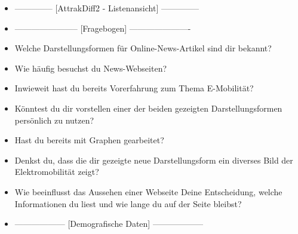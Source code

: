 {\begin{itemize}[]
        \item {--------------} [AttrakDiff2 - Listenansicht] {--------------}
        \item {-----------------------} [Fragebogen] {----------------------}
        \item {} Welche Darstellungsformen für Online-News-Artikel sind dir bekannt?
        \item {} Wie häufig besuchst du News-Webseiten?
        \item {} Inwieweit hast du bereits Vorerfahrung zum Thema E-Mobilität?
        \item {} Könntest du dir vorstellen einer der beiden gezeigten Darstellungsformen persönlich zu nutzen?
        \item {} Hast du bereits mit Graphen gearbeitet?
        \item {} Denkst du, dass die dir gezeigte neue Darstellungsform ein diverses Bild der Elektromobilität zeigt?
        \item {} Wie beeinflusst das Aussehen einer Webseite Deine Entscheidung, welche Informationen du liest und wie lange du auf der Seite bleibst?
        \item {------------------} [Demografische Daten] {------------------}
    \end{itemize}}
\nolinenumbers
